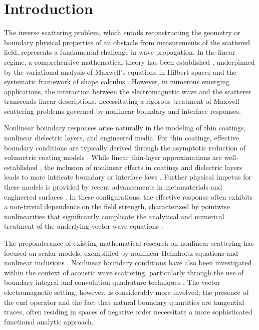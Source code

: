 \documentclass[12pt,reqno]{amsart}
\theoremstyle{definition}
\numberwithin{equation}{section}
\begin{document}
\maketitle

\section{Introduction}

The inverse scattering problem, which entails reconstructing the geometry or boundary physical properties of an obstacle from measurements of the scattered field, represents a fundamental challenge in wave propagation. In the linear regime, a comprehensive mathematical theory has been established \cite{Colton2013, Kirsch2008}, underpinned by the variational analysis of Maxwell's equations in Hilbert spaces \cite{BuffaCostabelSheen2002} and the systematic framework of shape calculus \cite{SokolowskiZolesio1992, Delfour2011}. However, in numerous emerging applications, the interaction between the electromagnetic wave and the scatterer transcends linear descriptions, necessitating a rigorous treatment of Maxwell scattering problems governed by nonlinear boundary and interface responses.

Nonlinear boundary responses arise naturally in the modeling of thin coatings, nonlinear dielectric layers, and engineered media. For thin coatings, effective boundary conditions are typically derived through the asymptotic reduction of volumetric coating models \cite{Senior1995, Haddar2002}. While linear thin-layer approximations are well-established \cite{Ammari1998, Bendali1996, Durufle2006}, the inclusion of nonlinear effects in coatings and dielectric layers leads to more intricate boundary or interface laws \cite{Norgren1999, Shestopalov2010, Smirnov2004}. Further physical impetus for these models is provided by recent advancements in metamaterials and engineered surfaces \cite{engheta2006metamaterials, Kadic2019}. In these configurations, the effective response often exhibits a non-trivial dependence on the field strength, characterized by pointwise nonlinearities that significantly complicate the analytical and numerical treatment of the underlying vector wave equations \cite{Norgren1999, Shestopalov2010, Smirnov2004}.

The preponderance of existing mathematical research on nonlinear scattering has focused on scalar models, exemplified by nonlinear Helmholtz equations and nonlinear inclusions \cite{Griesmaier2022, Lechleiter2011}. Nonlinear boundary conditions have also been investigated within the context of acoustic wave scattering, particularly through the use of boundary integral and convolution quadrature techniques \cite{BanjaiLubich2019, Banjai2016}. The vector electromagnetic setting, however, is considerably more involved; the presence of the curl operator and the fact that natural boundary quantities are tangential traces, often residing in spaces of negative order necessitate a more sophisticated functional analytic approach.
\end{document}
